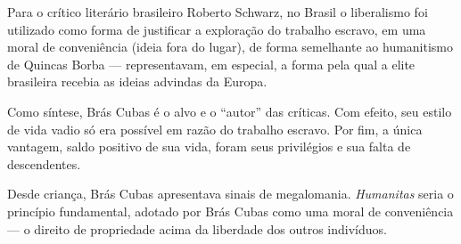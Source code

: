 Para o crítico literário brasileiro Roberto Schwarz, no Brasil o liberalismo foi utilizado como forma de justificar a exploração do trabalho escravo, em uma moral de conveniência (ideia fora do lugar), de forma semelhante ao humanitismo de Quincas Borba — representavam, em especial, a forma pela qual a elite brasileira recebia as ideias advindas da Europa.

Como síntese, Brás Cubas é o alvo e o ``autor'' das críticas. Com efeito, seu estilo de vida vadio só era possível em razão do trabalho escravo. Por fim, a única vantagem, saldo positivo de sua vida, foram seus privilégios e sua falta de descendentes.

Desde criança, Brás Cubas apresentava sinais de megalomania. \textit{Humanitas} seria o princípio fundamental, adotado por Brás Cubas como uma moral de conveniência — o direito de propriedade acima da liberdade dos outros indivíduos.